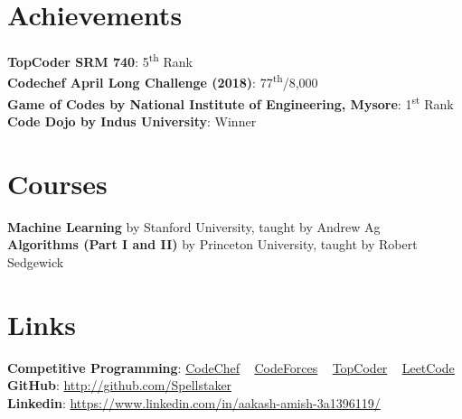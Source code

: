\documentclass[margin, centered]{res}
\begin{document}
\begin{resume}
		\section{Achievements}
			\textbf{TopCoder SRM 740}: 5\textsuperscript{th} Rank\\
			\textbf{Codechef April Long Challenge (2018)}: 77\textsuperscript{th}/8,000\\
			\textbf{Game of Codes by National Institute of Engineering, Mysore}: 1\textsuperscript{st} Rank \\
			\textbf{Code Dojo by Indus University}: Winner
		\\
		\section{Courses}
			\textbf{Machine Learning} by Stanford University, taught by Andrew Ag\\
			\textbf{Algorithms (Part I and II)} by Princeton University, taught by Robert Sedgewick
		\\
		\section{Links}
			\textbf{Competitive Programming}:
			\href{https://www.codechef.com/users/spellstaker}{CodeChef}
			~
			\href{https://codeforces.com/profile/spellstaker}{CodeForces}
			~
			\href{https://topcoder.com/members/spellstaker/}{TopCoder}
			~
			\href{https://leetcode.com/spellstaker/}{LeetCode}
			\\
			\textbf{GitHub}: \href{https://github.com/Spellstaker}{http://github.com/Spellstaker}
			\\
			\textbf{Linkedin}: \href{https://www.linkedin.com/in/aakash-amish-3a1396119/}{https://www.linkedin.com/in/aakash-amish-3a1396119/}
	\end{resume}
\end{document}
